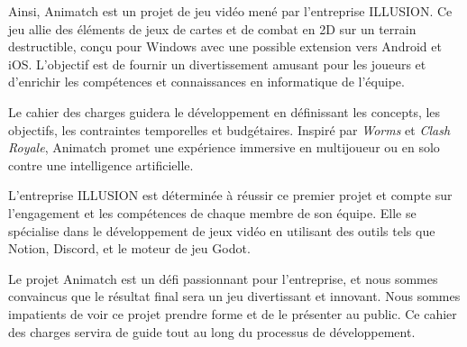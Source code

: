 \documentclass[12pt,a4paper]{article}
\begin{document}
Ainsi, Animatch est un projet de jeu vidéo mené par l'entreprise ILLUSION. Ce jeu allie des éléments de jeux de cartes et de combat en 2D sur un terrain destructible, conçu pour Windows avec une possible extension vers Android et iOS. L'objectif est de fournir un divertissement amusant pour les joueurs et d'enrichir les compétences et connaissances en informatique de l'équipe.
 
Le cahier des charges guidera le développement en définissant les concepts, les objectifs, les contraintes temporelles et budgétaires. Inspiré par \textit{Worms} et \textit{Clash Royale}, Animatch promet une expérience immersive en multijoueur ou en solo contre une intelligence artificielle.

L'entreprise ILLUSION est déterminée à réussir ce premier projet et compte sur l'engagement et les compétences de chaque membre de son équipe. Elle se spécialise dans le développement de jeux vidéo en utilisant des outils tels que Notion, Discord, et le moteur de jeu Godot.

Le projet Animatch est un défi passionnant pour l’entreprise, et nous sommes convaincus que le résultat final sera un jeu divertissant et innovant. Nous sommes impatients de voir ce projet prendre forme et de le présenter au public. Ce cahier des charges servira de guide tout au long du processus de développement.


\clearpage

\end{document}
